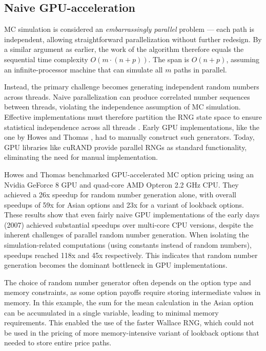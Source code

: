 \documentclass[english,12pt,a4paper,pdftex,sci,utf8]{aaltothesis}
\begin{document}
\subsection{Naive GPU-acceleration}
MC simulation is considered an \emph{embarrassingly parallel} problem --- each path is independent, allowing straightforward parallelization without further redesign. By a similar argument as earlier, the work of the algorithm therefore equals the sequential time complexity $O(m \cdot (n+p))$. The span is $O(n+p)$, assuming an infinite-processor machine that can simulate all $m$ paths in parallel.

Instead, the primary challenge becomes generating independent random numbers across threads. Naive parallelization can produce correlated number sequences between threads, violating the independence assumption of MC simulation. Effective implementations must therefore partition the RNG state space to ensure statistical independence across all threads \cite{gentle2003random}. Early GPU implementations, like the one by Howes and Thomas \cite{nguyen2007gpu}, had to manually construct such generators. Today, GPU libraries like cuRAND \cite{curand2025} provide parallel RNGs as standard functionality, eliminating the need for manual implementation.

Howes and Thomas \cite{nguyen2007gpu} benchmarked GPU-accelerated MC option pricing using an Nvidia GeForce 8 GPU and quad-core AMD Opteron 2.2 GHz CPU. They achieved a 26x speedup for random number generation alone, with overall speedups of 59x for Asian options and 23x for a variant of lookback options. These results show that even fairly naive GPU implementations of the early days (2007) achieved substantial speedups over multi-core CPU versions, despite the inherent challenges of parallel random number generation. When isolating the simulation-related computations (using constants instead of random numbers), speedups reached 118x and 45x respectively. This indicates that random number generation becomes the dominant bottleneck in GPU implementations. 

The choice of random number generator often depends on the option type and memory constraints, as some option payoffs require storing intermediate values in memory. In this example, the sum for the mean calculation in the Asian option can be accumulated in a single variable, leading to minimal memory requirements. This enabled the use of the faster Wallace RNG, which could not be used in the pricing of more memory-intensive variant of lookback options that needed to store entire price paths.
\end{document}
